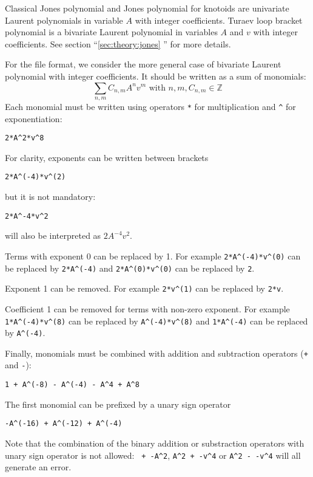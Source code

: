 Classical Jones polynomial and Jones polynomial for knotoids are univariate Laurent polynomials in variable $A$ with integer coefficients.
Turaev loop bracket polynomial is a bivariate Laurent polynomial in variables $A$ and $v$ with integer coefficients. See section ``\ref{sec:theory:jones} '' for more details.

For the file format, we consider the more general case of bivariate Laurent polynomial with integer coefficients. It should be written as a sum of monomials:
\[\sum_{n,m} C_{n,m}A^nv^m\text{ with }n,m,C_{n,m}\in\mathbb Z \]
Each monomial must be written using operators \lstinline{*} for multiplication and  \lstinline{^} for exponentiation:
\begin{lstlisting}
2*A^2*v^8
\end{lstlisting}

For clarity, exponents can be written between brackets
\begin{lstlisting}
2*A^(-4)*v^(2)
\end{lstlisting}
but it is not mandatory:
\begin{lstlisting}
2*A^-4*v^2
\end{lstlisting}
will also be interpreted as $2A^{-4}v^{2}$.

Terms with exponent 0 can be replaced by 1. For example \lstinline{2*A^(-4)*v^(0)} can be replaced by \lstinline{2*A^(-4)} and  \lstinline{2*A^(0)*v^(0)} can be replaced by \lstinline{2}.

Exponent 1 can be removed. For example \lstinline{2*v^(1)} can be replaced by \lstinline{2*v}.

Coefficient 1 can be removed for terms with non-zero exponent. For example  \lstinline{1*A^(-4)*v^(8)} can be replaced by \lstinline{A^(-4)*v^(8)} and   \lstinline{1*A^(-4)} can be replaced by \lstinline{A^(-4)}.

Finally, monomials must be combined with addition and subtraction operators (\lstinline{+} and \lstinline{-}):
\begin{lstlisting}
1 + A^(-8) - A^(-4) - A^4 + A^8
\end{lstlisting}
The first monomial can be prefixed by a unary sign operator
\begin{lstlisting}
-A^(-16) + A^(-12) + A^(-4)
\end{lstlisting}
Note that the combination of the binary addition or substraction operators with unary sign operator is not allowed: \lstinline{ + -A^2}, \lstinline{A^2 + -v^4} or \lstinline{A^2 - -v^4} will all generate an error.

